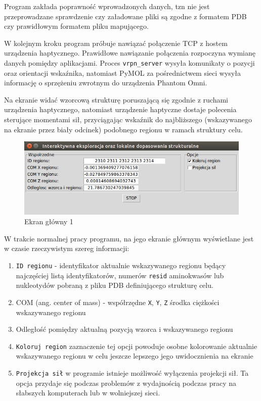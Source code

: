 \documentclass[licencjacka]{pracamgr}
\begin{document}
Program zakłada poprawność wprowadzonych danych, tzn nie jest przeprowadzane sprawdzenie czy załadowane pliki są zgodne z formatem PDB czy prawidłowym formatem pliku mapującego.

W kolejnym kroku program próbuje nawiązać połączenie TCP z hostem urządzenia haptycznego. Prawidłowe nawiązanie połączenia rozpoczyna wymianę danych pomiędzy aplikacjami. Proces \texttt{vrpn\_server} wysyła komunikaty o pozycji oraz orientacji wskaźnika, natomiast PyMOL za pośrednictwem sieci wysyła informację o sprzężeniu zwrotnym do urządzenia Phantom Omni. 

Na ekranie widać wzorcową strukturę poruszającą się zgodnie z ruchami urządzenia haptycznego, natomiast urządzenie haptyczne dostaje polecenia sterujące momentami sił, przyciągając wskaźnik do najbliższego (wskazywanego na ekranie przez biały odcinek) podobnego regionu w ramach struktury celu.

\begin{figure}[H]
\centering
\includegraphics[scale=0.7,center]{explorer_stats_pl}
\caption{Ekran główny 1}
\end{figure}

W trakcie normalnej pracy programu, na jego ekranie głównym wyświetlane jest w czasie rzeczywistym szereg informacji:
\begin{enumerate}

\item \texttt{ID regionu} - identyfikator aktualnie wskazywanego regionu będący najczęściej listą identyfikatorów, numerów \texttt{resid} aminokwasów lub nukleotydów pobraną z pliku PDB definiującego strukturę celu.

\item COM (ang. center of mass) - współrzędne \texttt{X}, \texttt{Y}, \texttt{Z} środka ciężkości wskazywanego regionu

\item Odległość pomiędzy aktualną pozycją wzorca i wskazywanego regionu

\item \texttt{Koloruj region} zaznaczenie tej opcji powoduje osobne kolorowanie aktualnie wskazywanego regionu w celu jeszcze lepszego jego uwidocznienia na ekranie

\item \texttt{Projekcja sił} w programie istnieje możliwość wyłączenia projekcji sił. Ta opcja przydaje się podczas problemów z wydajnością podczas pracy na słabszych komputerach lub w wolniejszej sieci.

\end{enumerate}
\end{document}
